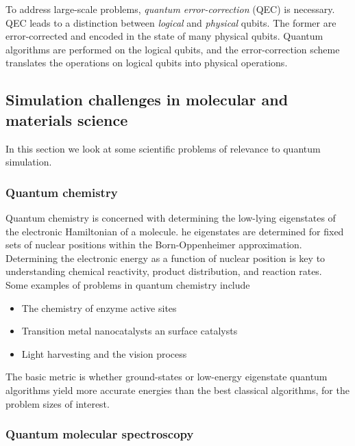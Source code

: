 \documentclass{book}
\theoremstyle{definition}
\begin{document}
To address large-scale problems, \textit{quantum error-correction} (QEC) is necessary. QEC leads to a distinction between \textit{logical} and \textit{physical} qubits. The former are error-corrected and encoded in the state of many physical qubits. Quantum algorithms are performed on the logical qubits, and the error-correction scheme translates the operations on logical qubits into physical operations. 



\newpage




\subsection{Simulation challenges in molecular and materials science }

In this section we look at some scientific problems of relevance to quantum simulation.

\subsubsection{Quantum chemistry}

Quantum chemistry is concerned with determining the low-lying eigenstates of the electronic Hamiltonian of a molecule. he eigenstates are determined for fixed sets of nuclear positions within the Born-Oppenheimer approximation. Determining the electronic energy as a function of nuclear position is key to understanding chemical reactivity, product distribution, and reaction rates.\\

Some examples of problems in quantum chemistry include
\begin{itemize}
	\item The chemistry of enzyme active sites
	\item Transition metal nanocatalysts an surface catalysts
	\item Light harvesting and the vision process
\end{itemize}

The basic metric is whether ground-states or low-energy eigenstate quantum algorithms yield more accurate energies than the best classical algorithms, for the problem sizes of interest. 

\subsubsection{Quantum molecular spectroscopy}
\end{document}
